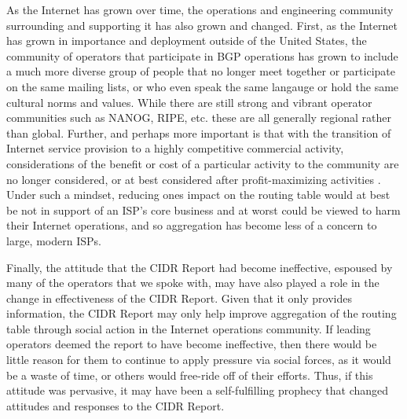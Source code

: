 As the Internet has grown over time, the operations and engineering community
surrounding and supporting it has also grown and changed. First, as the
Internet has grown in importance and deployment outside of the United States,
the community of operators that participate in BGP operations has grown to
include a much more diverse group of people that no longer meet together or
participate on the same mailing lists, or who even speak the same langauge or
hold the same cultural norms and values. While there are still strong and
vibrant operator communities such as NANOG, RIPE, etc. these are all generally
regional rather than global. Further, and perhaps more important is that with
the transition of Internet service provision to a highly competitive commercial
activity, considerations of the benefit or cost of a particular activity to the
community are no longer considered, or at best considered after
profit-maximizing activities \cite{Li:2011vn}. Under such a mindset, reducing
ones impact on the routing table would at best be not in support of an ISP's
core business and at worst could be viewed to harm their Internet operations,
and so aggregation has become less of a concern to large, modern ISPs.


Finally, the attitude that the CIDR Report had become ineffective, espoused by
many of the operators that we spoke with, may have also played a role in the
change in effectiveness of the CIDR Report. Given that it only provides
information, the CIDR Report may only help improve aggregation of the routing
table through social action in the Internet operations community. If leading
operators deemed the report to have become ineffective, then there would be
little reason for them to continue to apply pressure via social forces, as it
would be a waste of time, or others would free-ride off of their efforts. Thus,
if this attitude was pervasive, it may have been a self-fulfilling prophecy
that changed attitudes and responses to the CIDR Report.


